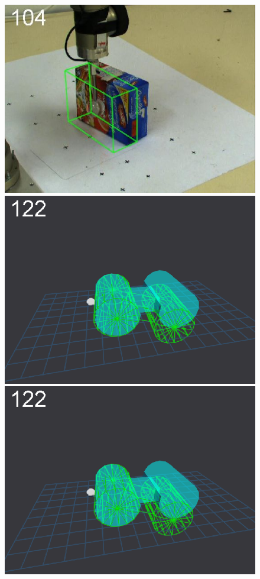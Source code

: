 \begin{figure}[tbp]
{\includegraphics[width=\imgCXwid]{images/C1_LWPR1_87_2}
\includegraphics[width=\imgCXwid]{images/C5_1exp_6_2}
\includegraphics[width=\imgCXwid]{images/C5_2exp_6_2}
}
\end{figure}
